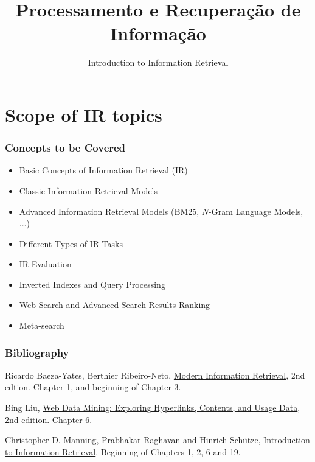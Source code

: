 \documentclass[svgnames]{beamer}
\title{Processamento e Recuperação de Informação}
\subtitle{Introduction to Information Retrieval}
\begin{document}
\maketitle
\makeoutline

\section{Scope of IR topics}

\begin{frame} \frametitle{Concepts to be Covered}

    \begin{itemize}
    \item Basic Concepts of Information Retrieval (IR)

    \item Classic Information Retrieval Models

    \item Advanced Information Retrieval Models (BM25, $N$-Gram Language Models, ...)
        
    \item Different Types of IR Tasks

    \item IR Evaluation

    \item Inverted Indexes and Query Processing

    \item Web Search and Advanced Search Results Ranking

    \item Meta-search
    \end{itemize}

\end{frame}

\begin{frame} \frametitle{Bibliography}

    \begin{block}{}
        Ricardo Baeza-Yates, Berthier
          Ribeiro-Neto, \href{http://www.mir2ed.org/}{Modern Information Retrieval}, 2nd edtion.
        \href{http://grupoweb.upf.edu/mir2ed/pdf/chapter1.pdf}{Chapter 1},
        and beginning of Chapter 3.
    \end{block}

    \begin{block}{}
        Bing Liu, \href{http://www.cs.uic.edu/~liub/WebMiningBook.html}{Web Data Mining: Exploring Hyperlinks, Contents, and Usage Data}, 2nd edition. Chapter 6.
    \end{block}

    \begin{block}{}
        Christopher D. Manning, Prabhakar Raghavan and Hinrich Schütze, \href{http://nlp.stanford.edu/IR-book/}{Introduction to Information Retrieval}. Beginning of Chapters 1, 2, 6 and 19. 
    \end{block}

\end{frame}
\end{document}
